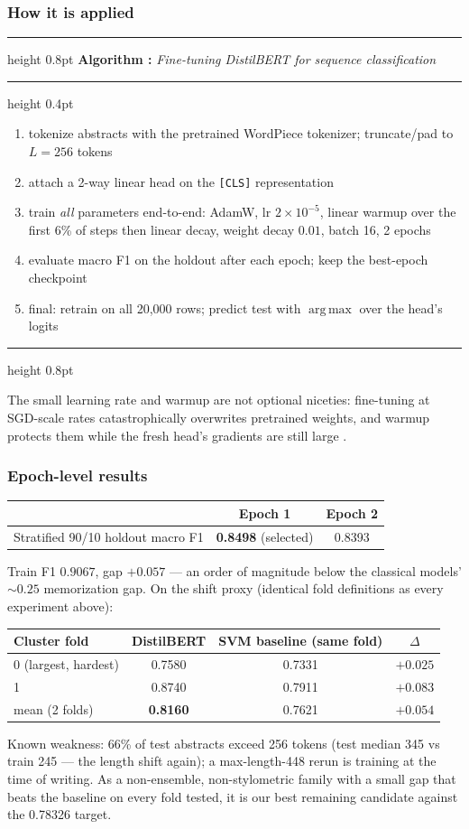 \documentclass[11pt,a4paper]{article}
\newcounter{algctr}
\newenvironment{algo}[1]{%
  \par\medskip\refstepcounter{algctr}%
  \noindent\hrule height 0.8pt \smallskip
  \noindent\textbf{Algorithm \thealgctr:} \emph{#1}\par\smallskip
  \hrule height 0.4pt \smallskip
  \begin{enumerate}\setlength{\itemsep}{1pt}\setlength{\parskip}{0pt}%
}{%
  \end{enumerate}\smallskip\hrule height 0.8pt \medskip
}
\DeclareMathOperator*{\argmax}{arg\,max}
\begin{document}
\subsubsection{How it is applied}
\begin{algo}{Fine-tuning DistilBERT for sequence classification}
\item tokenize abstracts with the pretrained WordPiece tokenizer; truncate/pad to $L = 256$ tokens
\item attach a 2-way linear head on the \texttt{[CLS]} representation
\item train \emph{all} parameters end-to-end: AdamW, lr $2{\times}10^{-5}$, linear warmup over the first 6\% of steps then linear decay, weight decay $0.01$, batch 16, 2 epochs
\item evaluate macro F1 on the holdout after each epoch; keep the best-epoch checkpoint
\item final: retrain on all 20{,}000 rows; predict test with $\argmax$ over the head's logits
\end{algo}

The small learning rate and warmup are not optional niceties: fine-tuning at SGD-scale rates catastrophically overwrites pretrained weights, and warmup protects them while the fresh head's gradients are still large \cite{devlin2019}.

\subsubsection{Epoch-level results}
\begin{center}
\begin{tabular}{lcc}
\toprule
& Epoch 1 & Epoch 2\\
\midrule
Stratified 90/10 holdout macro F1 & \textbf{0.8498} (selected) & 0.8393\\
\bottomrule
\end{tabular}
\end{center}
Train F1 $0.9067$, gap $+0.057$ --- an order of magnitude below the classical models' ${\sim}0.25$ memorization gap. On the shift proxy (identical fold definitions as every experiment above):
\begin{center}
\begin{tabular}{lccc}
\toprule
Cluster fold & DistilBERT & SVM baseline (same fold) & $\Delta$\\
\midrule
0 (largest, hardest) & 0.7580 & 0.7331 & $+0.025$\\
1 & 0.8740 & 0.7911 & $+0.083$\\
\midrule
mean (2 folds) & \textbf{0.8160} & 0.7621 & $+0.054$\\
\bottomrule
\end{tabular}
\end{center}
Known weakness: 66\% of test abstracts exceed 256 tokens (test median 345 vs train 245 --- the length shift again); a max-length-448 rerun is training at the time of writing. As a non-ensemble, non-stylometric family with a small gap that beats the baseline on every fold tested, it is our best remaining candidate against the 0.78326 target.
\end{document}
